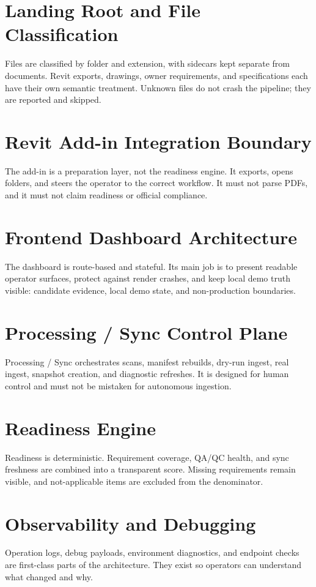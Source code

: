 \documentclass[11pt]{article}
\begin{document}
\section{Landing Root and File Classification}
Files are classified by folder and extension, with sidecars kept separate from documents. Revit exports, drawings, owner requirements, and specifications each have their own semantic treatment. Unknown files do not crash the pipeline; they are reported and skipped.

\section{Revit Add-in Integration Boundary}
The add-in is a preparation layer, not the readiness engine. It exports, opens folders, and steers the operator to the correct workflow. It must not parse PDFs, and it must not claim readiness or official compliance.

\section{Frontend Dashboard Architecture}
The dashboard is route-based and stateful. Its main job is to present readable operator surfaces, protect against render crashes, and keep local demo truth visible: candidate evidence, local demo state, and non-production boundaries.

\section{Processing / Sync Control Plane}
Processing / Sync orchestrates scans, manifest rebuilds, dry-run ingest, real ingest, snapshot creation, and diagnostic refreshes. It is designed for human control and must not be mistaken for autonomous ingestion.

\section{Readiness Engine}
Readiness is deterministic. Requirement coverage, QA/QC health, and sync freshness are combined into a transparent score. Missing requirements remain visible, and not-applicable items are excluded from the denominator.

\section{Observability and Debugging}
Operation logs, debug payloads, environment diagnostics, and endpoint checks are first-class parts of the architecture. They exist so operators can understand what changed and why.
\end{document}
